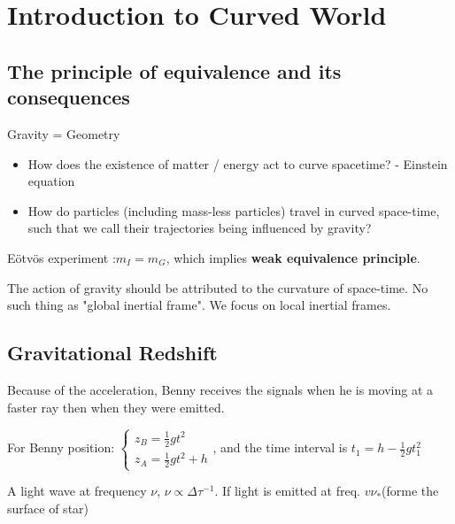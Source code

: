\newpage

\mainmatter
{}
\chapter{Introduction to Curved World}

\newpage

\section{The principle of equivalence and its consequences}

Gravity = Geometry
\begin{itemize}
    \item How does the existence of matter / energy act to curve spacetime? - Einstein equation
    \item How do particles (including mass-less particles) travel in curved space-time, such that we call their trajectories being influenced by gravity?
\end{itemize}

Eötvös experiment :$m_{I}=m_{G}$, which implies \textbf{weak equivalence principle}.



The action of gravity should be attributed to the curvature of space-time. No such thing as "global inertial frame". We focus on local inertial frames.

\section{Gravitational Redshift}

Because of the acceleration, Benny receives the signals when he is moving at a faster ray then when they were emitted.

For Benny position: $\begin{cases}z_{B}=\frac{1}{2}gt^{2}\\z_{A}=\frac{1}{2}gt^{2}+h\end{cases}$, and the time interval is $t_{1}=h-\frac{1}{2}gt_{1}^2$ 


A light wave at frequency $\nu$, $\nu \varpropto \Delta \tau^{-1}$. If light is emitted at freq. $v\nu_{*}$(forme the surface of star)

